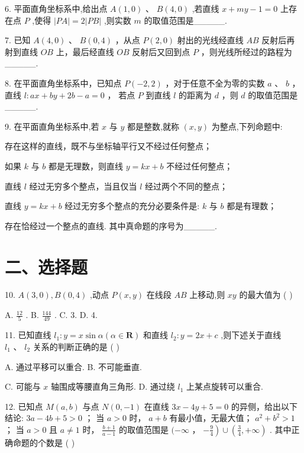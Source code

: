 6. 平面直角坐标系中,给出点 $A\left( {1,0}\right) \text{ 、 }B\left( {4,0}\right)$ ,若直线 $x + {my} - 1 = 0$ 上存在点 $P$ ,使得 $\left| {PA}\right|  = 2\left| {PB}\right|$ ,则实数 $m$ 的取值范围是\_\_\_\_\_.

7. 已知 $A\left( {4,0}\right)$ 、 $B\left( {0,4}\right)$ ，从点 $P\left( {2,0}\right)$ 射出的光线经直线 ${AB}$ 反射后再射到直线 ${OB}$ 上，最后经直线 ${OB}$ 反射后又回到点 $P$ ，则光线所经过的路程为\_\_\_\_\_.

8. 在平面直角坐标系中，已知点 $P\left( {-2,2}\right)$ ，对于任意不全为零的实数 $a$ 、 $b$ ，直线 $l : {ax} + {by} + {2b} - a = 0$ ， 若点 $P$ 到直线 $l$ 的距离为 $d$ ，则 $d$ 的取值范围是\_\_\_\_\_.

9. 在平面直角坐标系中,若 $x$ 与 $y$ 都是整数,就称 $\left( {x,y}\right)$ 为整点,下列命题中:

  存在这样的直线，既不与坐标轴平行又不经过任何整点；

  如果 $k$ 与 $b$ 都是无理数，则直线 $y = {kx} + b$ 不经过任何整点；

  直线 $l$ 经过无穷多个整点，当且仅当 $l$ 经过两个不同的整点；

  直线 $y = {kx} + b$ 经过无穷多个整点的充分必要条件是: $k$ 与 $b$ 都是有理数；

  存在恰经过一个整点的直线. 其中真命题的序号为\_\_\_\_\_.

\section*{二、选择题}

10. $A\left( {3,0}\right) ,B\left( {0,4}\right)$ ,动点 $P\left( {x,y}\right)$ 在线段 ${AB}$ 上移动,则 ${xy}$ 的最大值为 ( )

A. $\frac{12}{5}$ . B. $\frac{144}{49}$ . C. 3. D. 4.

11. 已知直线 ${l}_{1} : y = x\sin \alpha \left( {\alpha  \in  \mathbf{R}}\right)$ 和直线 ${l}_{2} : y = {2x} + c$ ,则下述关于直线 ${l}_{1}\text{ 、 }{l}_{2}$ 关系的判断正确的是 ( )

A. 通过平移可以重合. B. 不可能垂直.

C. 可能与 $x$ 轴围成等腰直角三角形. D. 通过绕 ${l}_{1}$ 上某点旋转可以重合.

12. 已知点 $M\left( {a,b}\right)$ 与点 $N\left( {0, - 1}\right)$ 在直线 ${3x} - {4y} + 5 = 0$ 的异侧，给出以下结论:   ${3a} - {4b} + 5 > 0$ ；   当 $a > 0$ 时， $a + b$ 有最小值，无最大值；   ${a}^{2} + {b}^{2} > 1$ ；   当 $a > 0$ 且 $a \neq  1$ 时， $\frac{b + 1}{a - 1}$ 的取值范围是 $( - \infty$ ， $\left. {-\frac{9}{4}}\right)  \cup  \left( {\frac{3}{4}, + \infty }\right)$ . 其中正确命题的个数是 ( )

